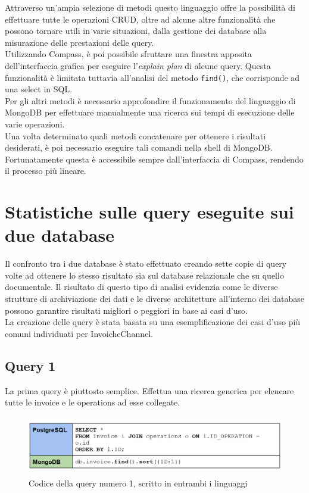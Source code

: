 \noindent Attraverso un'ampia selezione di metodi questo linguaggio offre la possibilità di effettuare tutte le \gls{operazioni CRUD}, oltre ad alcune altre funzionalità che possono tornare utili in varie situazioni, dalla gestione dei database alla misurazione delle prestazioni delle query.\\
Utilizzando Compass, è poi possibile sfruttare una finestra apposita dell'interfaccia grafica per eseguire l'\textit{explain plan} di alcune query. Questa funzionalità è limitata tuttavia all'analisi del metodo \texttt{find()}, che corrisponde ad una select in \gls{SQL}.\\
Per gli altri metodi è necessario approfondire il funzionamento del linguaggio di MongoDB per effettuare manualmente una ricerca sui tempi di esecuzione delle varie operazioni.\\
Una volta determinato quali metodi concatenare per ottenere i risultati desiderati, è poi necessario eseguire tali comandi nella shell di MongoDB. Fortunatamente questa è accessibile sempre dall'interfaccia di Compass, rendendo il processo più lineare.\\


\section{Statistiche sulle query eseguite sui due database}
Il confronto tra i due database è stato effettuato creando sette copie di query volte ad ottenere lo stesso risultato sia sul database relazionale che su quello documentale. Il risultato di questo tipo di analisi evidenzia come le diverse strutture di archiviazione dei dati e le diverse architetture all'interno dei database possono garantire risultati migliori o peggiori in base ai casi d'uso.\\
La creazione delle query è stata basata su una esemplificazione dei casi d'uso più comuni individuati per InvoicheChannel.

\subsection{Query 1}
La prima query è piuttosto semplice. Effettua una ricerca generica per elencare tutte le invoice e le operations ad esse collegate.\\

\begin{figure}[htbp]
\begin{center}
\includegraphics[height=7em]{immagini/query/query1.png}
\caption{Codice della query numero 1, scritto in entrambi i linguaggi}
\end{center}
\end{figure}


